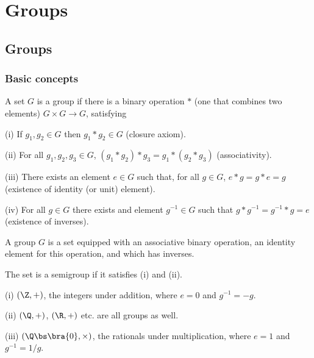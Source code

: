 
\chapter{Groups}

\section{Groups}

\subsection{Basic concepts}

\begin{definition}[Group]\label{def:group}
A set $G$ is a group if there is a binary operation $*$ (one that combines two elements) $G \times G \to G$, satisfying
\ben
\item [(i)] If $g_1, g_2 \in G$ then $g_1 * g_2 \in G$ (closure axiom).
\item [(ii)] For all $g_1, g_2, g_3 \in G$, $(g_1*g_2)*g_3 = g_1*(g_2*g_3)$ (associativity).
\item [(iii)] There exists an element $e \in G$ such that, for all $g \in G$, $e*g = g*e = g$ (existence of identity (or unit) element).
\item [(iv)] For all $g \in G$ there exists and element $g^{-1} \in G$ such that $g*g^{-1} = g^{-1}*g = e$ (existence of inverses).
\een
\end{definition}

\begin{remark}
A group $G$ is a set equipped with an associative binary operation, an identity element for this operation, and which has inverses.
\end{remark}

\begin{remark}
The set is a semigroup if it satisfies (i) and (ii).
\end{remark}

\begin{example}
\ben
\item [(i)] $(\Z,+)$, the integers under addition, where $e=0$ and $g^{-1} = -g$.
\item [(ii)] $(\Q,+)$, $(\R,+)$ etc. are all groups as well.
\item [(iii)] $(\Q\bs\bra{0},\times)$, the rationals under multiplication, where $e=1$ and $g^{-1} = 1/g$.
\een
\end{example}


